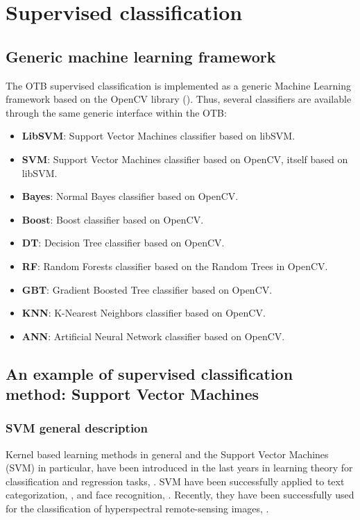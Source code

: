 \ifitkFullVersion

\fi 




\section{Supervised classification}

\subsection{Generic machine learning framework}
\label{sec:MLGenericFramework}

The OTB supervised classification is implemented as a generic Machine Learning 
framework based on the OpenCV library (\cite{opencv_library}). Thus, several 
classifiers are available through the same generic interface within the OTB:

\begin{itemize}
  \item \textbf{LibSVM}: Support Vector Machines classifier based on libSVM.
  \item \textbf{SVM}: Support Vector Machines classifier based on OpenCV, itself based on libSVM.
  \item \textbf{Bayes}: Normal Bayes classifier based on OpenCV.
  \item \textbf{Boost}: Boost classifier based on OpenCV.
  \item \textbf{DT}: Decision Tree classifier based on OpenCV.
  \item \textbf{RF}: Random Forests classifier based on the Random Trees in OpenCV.
  \item \textbf{GBT}: Gradient Boosted Tree classifier based on OpenCV.
  \item \textbf{KNN}: K-Nearest Neighbors classifier based on OpenCV.
  \item \textbf{ANN}: Artificial Neural Network classifier based on OpenCV.
\end{itemize}


\subsection{An example of supervised classification method: Support Vector Machines}
\label{sec:SupportVectorMachines}

\subsubsection{SVM general description}
Kernel based learning methods in general and the Support Vector
Machines (SVM) in particular, have been introduced in the last years
in learning theory for classification and regression tasks,
\cite{vapnik}. SVM have been successfully applied to text
categorization, \cite{joachims}, and face recognition,
\cite{osuna}. Recently, they have been successfully used for the
classification of hyperspectral remote-sensing images, \cite{bruzzoneSVM}.

